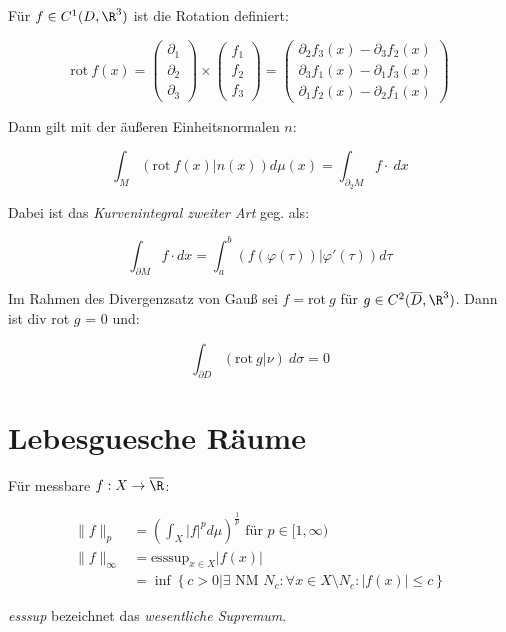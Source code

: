 Für $f \in C^1(D,\R^3)$ ist die Rotation definiert:

\vspace{-4mm}
$$\text{rot} \ f(x) = \begin{pmatrix}
	\partial_1 \\
	\partial_2 \\
	\partial_3
\end{pmatrix} \times \begin{pmatrix}
	f_1 \\
	f_2 \\
	f_3
\end{pmatrix} = \begin{pmatrix}
	\partial_2 f_3(x) - \partial_3 f_2(x) \\
	\partial_3 f_1(x) - \partial_1 f_3(x) \\
	\partial_1 f_2(x) - \partial_2 f_1(x)
\end{pmatrix}$$

Dann gilt mit der äußeren Einheitsnormalen $n$:

$$\int_M (\text{rot} \ f(x) | n(x)) d\mu(x) = \int_{\partial_2 M} f \cdot \ dx$$

Dabei ist das \emph{Kurvenintegral zweiter Art} geg. als:

$$\int_{\partial M} f \cdot dx = \int_a^b (f(\varphi(\tau))|\varphi'(\tau)) d\tau$$

Im Rahmen des Divergenzsatz von Gauß sei $f = \text{rot} \ g$ für $g \in C^2(\overline D,\R^3)$. Dann ist div rot $g$ = 0 und:

\vspace{-2mm}
$$\int_{\partial D} (\text{rot} \ g|\nu) \ d\sigma = 0$$

\section*{Lebesguesche Räume}

Für messbare $f : X \to \overline\R$:

\vspace{-4mm}
\begin{align*}
\|f\|_p &= \left(\int_X |f|^p d\mu\right)^\frac{1}{p} \text{ für } p \in [1,\infty)\\
\|f\|_\infty &= \text{esssup}_{x \in X} |f(x)|\\
      &= \inf\left\{ c > 0 | \exists \text{ NM } N_c : \forall x \in X \setminus N_c : |f(x)| \leq c\right\}
\end{align*}

\emph{esssup} bezeichnet das \emph{wesentliche Supremum}.

